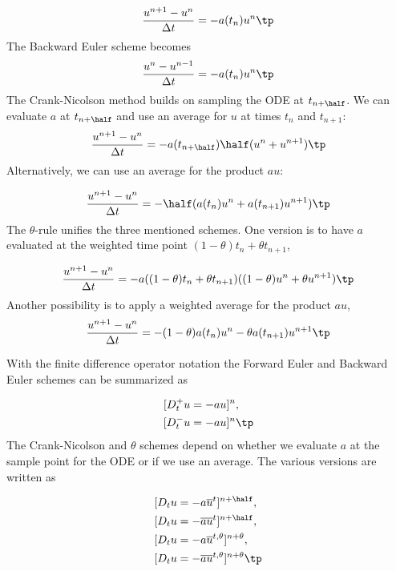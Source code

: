\documentclass[graybox,sectrefs,envcountresetchap,open=right,final]{svmonodo}
\begin{document}
\begin{equation}
\frac{u^{n+1} - u^n}{\Delta t} = -a(t_n)u^n
\tp
\end{equation}
The Backward Euler scheme becomes
\begin{equation}
\frac{u^{n} - u^{n-1}}{\Delta t} = -a(t_n)u^n
\tp
\end{equation}
The Crank-Nicolson method builds on sampling the ODE at
$t_{n+\half}$. We can evaluate $a$ at $t_{n+\half}$
and use an average for $u$ at
times $t_n$ and $t_{n+1}$:
\begin{equation}
\frac{u^{n+1} - u^{n}}{\Delta t} = -a(t_{n+\half})\half(u^n + u^{n+1})
\tp
\end{equation}
Alternatively, we can use an average for the product $au$:

\begin{equation}
\frac{u^{n+1} - u^{n}}{\Delta t} = -\half(a(t_n)u^n + a(t_{n+1})u^{n+1})
\tp
\end{equation}
The $\theta$-rule unifies the three mentioned schemes. One version is to
have $a$ evaluated at the weighted time point $(1-\theta)t_n + \theta t_{n+1}$,

\begin{equation}
\frac{u^{n+1} - u^{n}}{\Delta t} = -a((1-\theta)t_n + \theta t_{n+1})((1-\theta) u^n + \theta u^{n+1})
\tp
\end{equation}
Another possibility is to apply a weighted average for the product $au$,
\begin{equation}
\frac{u^{n+1} - u^{n}}{\Delta t} = -(1-\theta) a(t_n)u^n - \theta
a(t_{n+1})u^{n+1}
\tp
\end{equation}

With the finite difference operator notation the Forward Euler and Backward
Euler schemes can be summarized as

\begin{align}
\lbrack D^+_t u &= -au\rbrack^n,\\ 
\lbrack D^-_t u &= -au\rbrack^n
\tp
\end{align}
The Crank-Nicolson and $\theta$ schemes depend on whether we evaluate
$a$ at the sample point for the ODE or if we use an average. The
various versions are written as

\begin{align}
\lbrack D_t u &= -a\overline{u}^t\rbrack^{n+\half},\\ 
\lbrack D_t u &= -\overline{au}^t\rbrack^{n+\half},\\ 
\lbrack D_t u &= -a\overline{u}^{t,\theta}\rbrack^{n+\theta},\\ 
\lbrack D_t u &= -\overline{au}^{t,\theta}\rbrack^{n+\theta}
\tp
\end{align}
\end{document}

